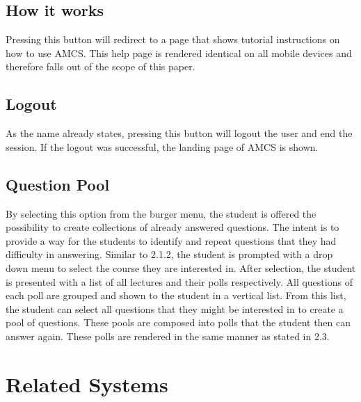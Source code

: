 \subsection{How it works}

Pressing this button will redirect to a page that shows tutorial instructions on how to use AMCS.
This help page is rendered identical on all mobile devices and therefore falls out of the scope of this paper.

\subsection{Logout}

As the name already states, pressing this button will logout the user and end the session. 
If the logout was successful, the landing page of AMCS is shown.



\subsection{Question Pool}

By selecting this option from the burger menu, the student is offered the possibility to create collections of already answered questions. The intent is to provide a way for the students to identify and repeat questions that they had difficulty in answering.
Similar to 2.1.2, the student is prompted with a drop down menu to select the course they are interested in. After selection, the student is presented with a list of all lectures and their polls respectively. All questions of each poll are grouped and shown to the student in a vertical list. From this list, the student can select all questions that they might be interested in to create a pool of questions.
These pools are composed into polls that the student then can answer again. These polls are rendered in the same manner as stated in 2.3.


\section{Related Systems}
